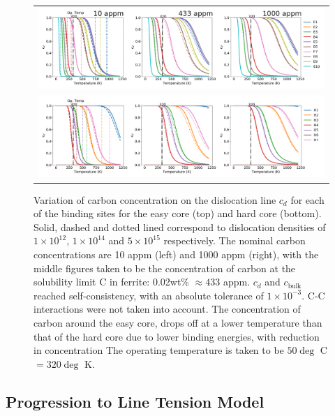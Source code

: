 \documentclass[a4paper,11pt]{article}
\begin{document}
\begin{landscape}
   \begin{figure}	
       \begin{tabular}{c}
      	        \includegraphics[width=1.65\textwidth]{Images/cd_easy_core_ferrite_sc_all_10_433_1000_appm.png}  \\
      	        \includegraphics[width=1.65\textwidth]{Images/cd_hard_core_ferrite_sc_all_10_433_1000_appm.png}  \\

          	   \end{tabular}		
   \caption{ Variation of carbon concentration on the dislocation line $c_d$ for each of the binding sites for the easy core (top) and hard core (bottom). Solid, dashed and dotted lined correspond to dislocation densities of $1\times10^{12}$, $1\times10^{14}$ and $5\times10^{15}$ respectively. The nominal carbon concentrations are 10 appm (left) and 1000 appm (right), with the middle figures taken to be the concentration of carbon at the solubility limit C in ferrite: 0.02wt\% $\approx433$ appm. $c_d$ and $c_{\text{bulk}}$ reached self-consistency, with an absolute tolerance of $1\times10^{-3}$. C-C interactions were not taken into account. The concentration of carbon around the easy core, drops off at a lower temperature than that of the hard core due to lower binding energies, with reduction in concentration  The operating temperature is taken to be $50\deg$ C $= 320 \deg$ K. }
   \label{cdhardeasy}
      \end{figure}
      \end{landscape}






\subsection{Progression to Line Tension Model}
\label{sec:org36ffeae}
\end{document}
